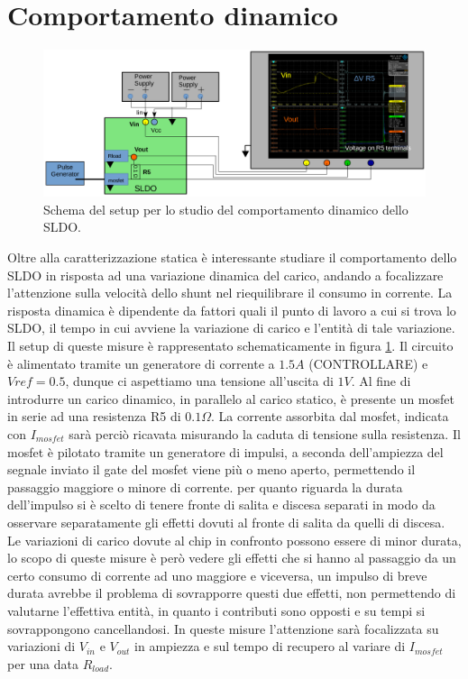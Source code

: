 \section{Comportamento dinamico}

\begin{figure}
\centering
\includegraphics[scale=.3]{Immagini/SetupScheme}
\caption{Schema del setup per lo studio del comportamento dinamico dello SLDO.}
\label{Setupscheme}
\end{figure}

Oltre alla caratterizzazione statica è interessante studiare il comportamento dello SLDO in risposta ad una variazione dinamica del carico, andando a focalizzare l'attenzione sulla velocità dello shunt nel riequilibrare il consumo in corrente. La risposta dinamica è dipendente da fattori quali il punto di lavoro a cui si trova lo SLDO, il tempo in cui avviene la variazione di carico e l'entità di tale variazione.
Il setup di queste misure è rappresentato schematicamente in figura \ref{Setupscheme}. Il circuito è alimentato tramite un generatore di corrente a $1.5A$ (CONTROLLARE) e $Vref=0.5 $, dunque ci aspettiamo una tensione all'uscita di $1V$. Al fine di introdurre un carico dinamico, in parallelo al carico statico, è presente un mosfet in serie ad una resistenza R5 di $0.1 \Omega$.
La corrente assorbita dal mosfet, indicata con $I_{mosfet}$ sarà perciò ricavata misurando la caduta di tensione sulla resistenza. Il mosfet è pilotato tramite un generatore di impulsi, a seconda dell'ampiezza del segnale inviato il gate del mosfet viene più o meno aperto, permettendo il passaggio maggiore o minore di corrente.
per quanto riguarda la durata dell'impulso si è scelto di tenere fronte di salita e discesa separati in modo da osservare separatamente gli effetti dovuti al fronte di salita da quelli di discesa. Le variazioni di carico dovute al chip in confronto possono essere di minor durata, lo scopo di queste misure è però vedere gli effetti che si hanno al passaggio da un certo consumo di corrente ad uno maggiore e viceversa, un impulso di breve durata avrebbe il problema di sovrapporre questi due effetti, non permettendo di valutarne l'effettiva entità, in quanto i contributi sono opposti e su tempi si sovrappongono cancellandosi.
In queste misure l'attenzione sarà focalizzata su variazioni di $V_{in}$ e $V_{out}$ in ampiezza e sul tempo di recupero al variare di $I_{mosfet}$ per una data $R_{load}$.

